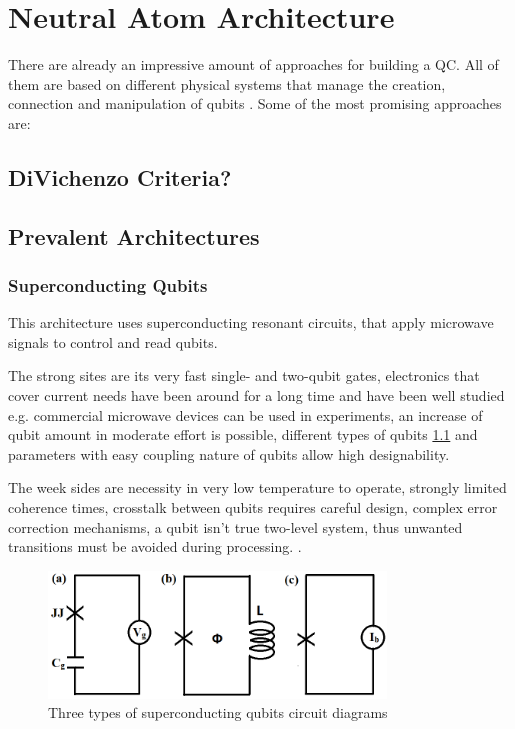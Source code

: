 
\chapter{Neutral Atom Architecture}\label{chapter:neutralatom}
There are already an impressive amount of approaches for building a \ac{QC}.
All of them are based on different physical systems that manage the creation, connection and manipulation of qubits \parencite{Wintersperger_2023}.
Some of the most promising approaches are:
\section{DiVichenzo Criteria?}
\section{Prevalent Architectures}
\subsection{Superconducting Qubits}
This architecture uses superconducting resonant circuits, that apply microwave signals to control and read qubits. 

The strong sites are its very fast single- and two-qubit gates,
electronics that cover current needs have been around for a long time and have been well studied 
e.g. commercial microwave devices can be used in experiments,
an increase of qubit amount in moderate effort is possible, 
different types of qubits \ref{fig:superconducting} and parameters with easy coupling nature of qubits allow high designability.

The week sides are necessity in very low temperature to operate, strongly limited coherence times, 
crosstalk between qubits requires careful design, complex error correction mechanisms,
a qubit isn't true two-level system, thus unwanted transitions must be avoided during processing. 
\parencite{Huang_2020}.
\begin{figure}[htbp]
  \centering
    \includegraphics[width=0.8\textwidth]{figures/Superconducting.png}
    \caption{Three types of superconducting qubits circuit diagrams \parencite{Huang_2020}}
    \label{fig:superconducting}
\end{figure}

